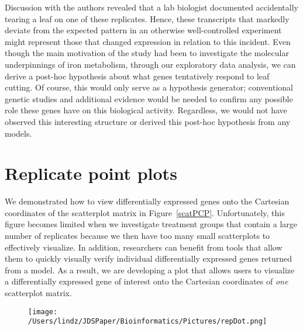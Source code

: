 \documentclass[useAMS,referee]{biom}
\begin{document}
Discussion with the authors revealed that a lab biologist documented accidentally tearing a leaf on one of these replicates. Hence, these transcripts that markedly deviate from the expected pattern in an otherwise well-controlled experiment might represent those that changed expression in relation to this incident. Even though the main motivation of the study had been to investigate the molecular underpinnings of iron metabolism, through our exploratory data analysis, we can derive a post-hoc hypothesis about what genes tentatively respond to leaf cutting. Of course, this would only serve as a hypothesis generator; conventional genetic studies and additional evidence would be needed to confirm any possible role these genes have on this biological activity. Regardless, we would not have observed this interesting structure or derived this post-hoc hypothesis from any models.

\begin{figure}
\begin{center}
\centerline{}
\end{center}
\caption{
\label{structure}}
\end{figure}

\section{Replicate point plots}
\label{s:repPoint}

We demonstrated how to view differentially expressed genes onto the Cartesian coordinates of the scatterplot matrix in Figure~\ref{scatPCP}. Unfortunately, this figure becomes limited when we investigate treatment groups that contain a large number of replicates because we then have too many small scatterplots to effectively visualize. In addition, researchers can benefit from tools that allow them to quickly visually verify individual differentially expressed genes returned from a model. As a result, we are developing a plot that allows users to visualize a differentially expressed gene of interest onto the Cartesian coordinates of \textit{one} scatterplot matrix.

\begin{figure}
\begin{center}
\centerline{\texttt{[image: /Users/lindz/JDSPaper/Bioinformatics/Pictures/repDot.png]}}
\end{center}
\caption{
\label{repDot}}
\end{figure}
\end{document}
